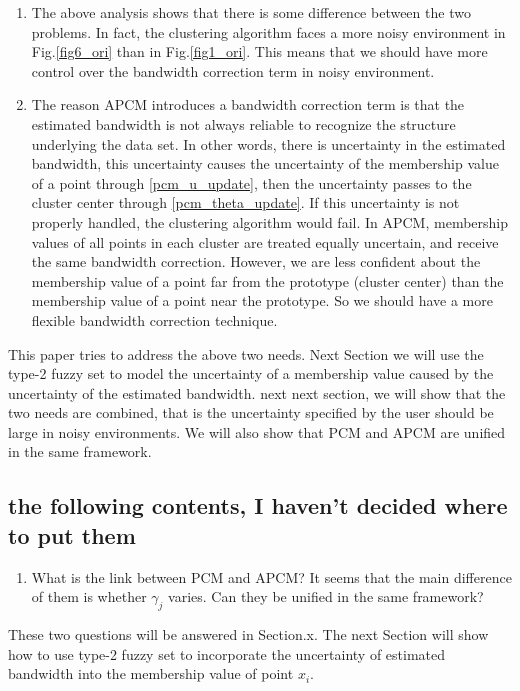 \documentclass[journal]{IEEEtran}
\begin{document}
\begin{enumerate}
\item The above analysis shows that there is some difference between the two problems. In fact, the clustering algorithm faces a more noisy environment in Fig.\ref{fig6_ori} than in Fig.\ref{fig1_ori}. This means that we should have more control over the bandwidth correction term in noisy environment.
\item The reason APCM introduces a bandwidth correction term is that the estimated bandwidth is not always reliable to recognize the structure underlying the data set. In other words, there is uncertainty in the estimated bandwidth, this uncertainty causes the uncertainty of the membership value of a point through \ref{pcm_u_update}, then the uncertainty passes to the cluster center through \ref{pcm_theta_update}. If this uncertainty is not properly handled, the clustering algorithm would fail. 
In APCM, membership values of all points in each cluster are treated equally uncertain, and receive the same bandwidth correction.
However, we are less confident about the membership value of a point far from the prototype (cluster center) than the membership value of a point near the prototype. So we should have a more flexible bandwidth correction technique.
\end{enumerate}

This paper tries to address the above two needs. Next Section we will use the type-2 fuzzy set to model the uncertainty of a membership value caused by the uncertainty of the estimated bandwidth. next next section, we will show that the two needs are combined, that is the uncertainty specified by the user should be large in noisy environments. We will also show that PCM and APCM are unified in the same framework.

\subsection{the following contents, I haven't decided where to put them}
\label{sec-1-3}

\begin{enumerate}
\item What is the link between PCM and APCM?
It seems that the main difference of them is whether $\gamma_j$ varies. Can they be unified in the same framework?
\end{enumerate}
These two questions will be answered in Section.x. The next Section will show how to use type-2 fuzzy set to incorporate the uncertainty of estimated bandwidth into the membership value of point $x_i$.
\end{document}
